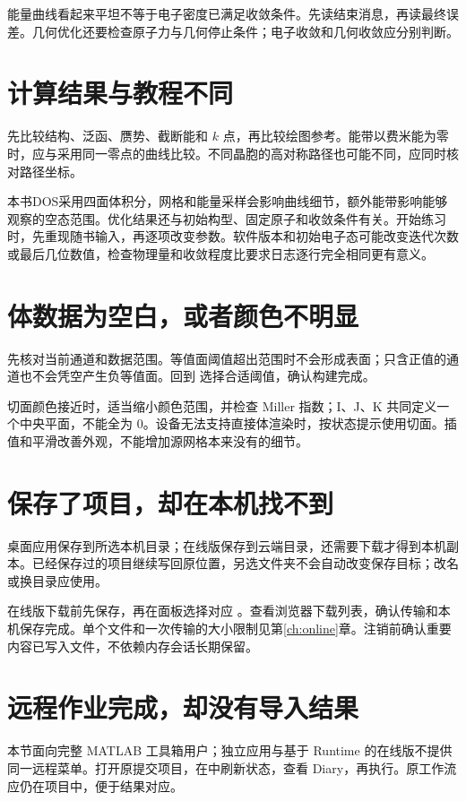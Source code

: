 能量曲线看起来平坦不等于电子密度已满足收敛条件。先读结束消息，再读最终误差。几何优化还要检查原子力与几何停止条件；电子收敛和几何收敛应分别判断。

\section{计算结果与教程不同}

先比较结构、泛函、赝势、截断能和 $k$ 点，再比较绘图参考。能带以费米能为零时，应与采用同一零点的曲线比较。不同晶胞的高对称路径也可能不同，应同时核对路径坐标。

本书DOS采用四面体积分，网格和能量采样会影响曲线细节，额外能带影响能够观察的空态范围。优化结果还与初始构型、固定原子和收敛条件有关。开始练习时，先重现随书输入，再逐项改变参数。软件版本和初始电子态可能改变迭代次数或最后几位数值，检查物理量和收敛程度比要求日志逐行完全相同更有意义。

\section{体数据为空白，或者颜色不明显}

先核对当前通道和数据范围。等值面阈值超出范围时不会形成表面；只含正值的通道也不会凭空产生负等值面。回到  选择合适阈值，确认构建完成。

切面颜色接近时，适当缩小颜色范围，并检查 Miller 指数；I、J、K 共同定义一个中央平面，不能全为 0。设备无法支持直接体渲染时，按状态提示使用切面。插值和平滑改善外观，不能增加源网格本来没有的细节。

\section{保存了项目，却在本机找不到}

桌面应用保存到所选本机目录；在线版保存到云端目录，还需要下载才得到本机副本。已经保存过的项目继续写回原位置，另选文件夹不会自动改变保存目标；改名或换目录应使用。

在线版下载前先保存，再在面板选择对应 。查看浏览器下载列表，确认传输和本机保存完成。单个文件和一次传输的大小限制见第\ref{ch:online}章。注销前确认重要内容已写入文件，不依赖内存会话长期保留。

\section{远程作业完成，却没有导入结果}

本节面向完整 MATLAB\regmark{} 工具箱用户；独立应用与基于 Runtime 的在线版不提供同一远程菜单。打开原提交项目，在中刷新状态，查看 Diary，再执行。原工作流应仍在项目中，便于结果对应。

